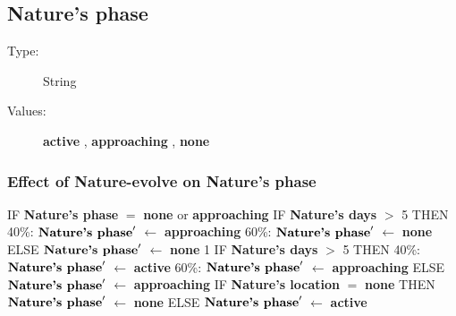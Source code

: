 \documentclass{article}%
\begin{document}
%
\subsection{Nature's phase}%
\label{subsec:Nature's phase}%
\begin{description}%
\item[Type:]%
String%
\item[Values:]%
\textbf{active}%
, %
\textbf{approaching}%
, %
\textbf{none}%
\end{description}%
\subsubsection{Effect of Nature{-}evolve on Nature's phase}%
\label{ssubsec:Effect of Nature{-}evolve on Nature's phase}%
\begin{flushleft}%
IF %
\textbf{Nature's phase}%
$=$%
\textbf{none}%
 or %
\textbf{approaching}%
\linebreak%
\hspace*{2em}%
IF %
\textbf{Nature's days}%
$>$%
5%
\linebreak%
\hspace*{4em}%
THEN %
\linebreak%
\hspace*{6em}%
40\%: %
$\mbox{\textbf{Nature's phase}} '$%
$\leftarrow$%
\textbf{approaching}%
\linebreak%
\hspace*{6em}%
60\%: %
$\mbox{\textbf{Nature's phase}} '$%
$\leftarrow$%
\textbf{none}%
\linebreak%
\hspace*{4em}%
ELSE %
$\mbox{\textbf{Nature's phase}} '$%
$\leftarrow$%
\textbf{none}%
\linebreak%
\hspace*{2em}%
1 %
IF %
\textbf{Nature's days}%
$>$%
5%
\linebreak%
\hspace*{4em}%
THEN %
\linebreak%
\hspace*{6em}%
40\%: %
$\mbox{\textbf{Nature's phase}} '$%
$\leftarrow$%
\textbf{active}%
\linebreak%
\hspace*{6em}%
60\%: %
$\mbox{\textbf{Nature's phase}} '$%
$\leftarrow$%
\textbf{approaching}%
\linebreak%
\hspace*{4em}%
ELSE %
$\mbox{\textbf{Nature's phase}} '$%
$\leftarrow$%
\textbf{approaching}%
\linebreak%
\hspace*{2em}%
IF %
\textbf{Nature's location}%
$=$%
\textbf{none}%
\linebreak%
\hspace*{4em}%
THEN %
$\mbox{\textbf{Nature's phase}} '$%
$\leftarrow$%
\textbf{none}%
\linebreak%
\hspace*{4em}%
ELSE %
$\mbox{\textbf{Nature's phase}} '$%
$\leftarrow$%
\textbf{active}%
\end{flushleft}
\end{document}
